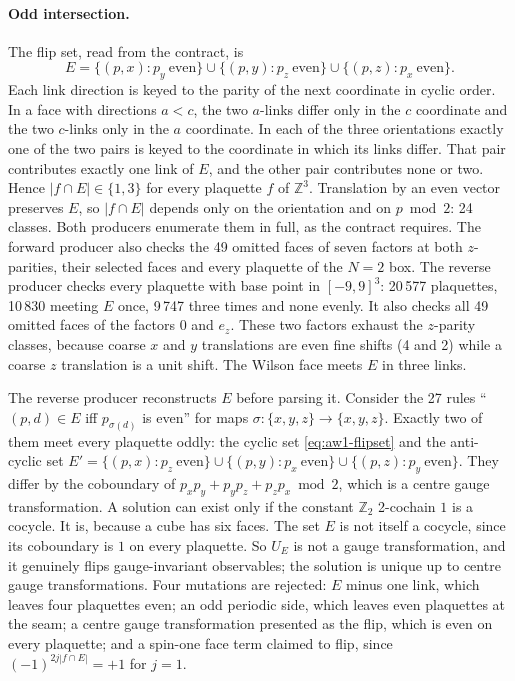 \paragraph{Odd intersection.}
The flip set, read from the contract, is
\begin{equation}
 E=\{(p,x):p_y\ \text{even}\}\cup\{(p,y):p_z\ \text{even}\}\cup\{(p,z):p_x\ \text{even}\}.
 \label{eq:aw1-flipset}
\end{equation}
Each link direction is keyed to the parity of the next coordinate in cyclic
order. In a face with directions $a<c$, the two $a$-links differ only in the
$c$ coordinate and the two $c$-links only in the $a$ coordinate. In each of
the three orientations exactly one of the two pairs is keyed to the
coordinate in which its links differ. That pair contributes exactly one link
of $E$, and the other pair contributes none or two. Hence $|f\cap E|\in\{1,3\}$
for every plaquette $f$ of $\mathbb Z^3$. Translation by an even vector
preserves $E$, so $|f\cap E|$ depends only on the orientation and on
$p\bmod2$: 24 classes. Both producers enumerate them in full, as the contract
requires. The forward producer also checks the 49 omitted faces of seven
factors at both $z$-parities, their selected faces and every plaquette of the
$N=2$ box. The reverse producer checks every plaquette with base point in
$[-9,9]^3$: 20\,577 plaquettes, 10\,830 meeting $E$ once, 9\,747 three times
and none evenly. It also checks all 49 omitted faces of the factors $0$ and
$e_z$. These two factors exhaust the $z$-parity classes, because coarse $x$
and $y$ translations are even fine shifts (4 and 2) while a coarse $z$
translation is a unit shift. The Wilson face meets $E$ in three links.

The reverse producer reconstructs $E$ before parsing it. Consider the 27
rules ``$(p,d)\in E$ iff $p_{\sigma(d)}$ is even'' for maps
$\sigma:\{x,y,z\}\to\{x,y,z\}$. Exactly two of them meet every plaquette
oddly: the cyclic set \eqref{eq:aw1-flipset} and the anti-cyclic set
$E'=\{(p,x):p_z\ \text{even}\}\cup\{(p,y):p_x\ \text{even}\}\cup\{(p,z):p_y\ \text{even}\}$.
They differ by the coboundary of $p_xp_y+p_yp_z+p_zp_x\bmod2$, which is a
centre gauge transformation. A solution can exist only if the constant
$\mathbb Z_2$ 2-cochain $1$ is a cocycle. It is, because a cube has six faces.
The set $E$ is not itself a cocycle, since its coboundary is $1$ on every
plaquette. So $U_E$ is not a gauge transformation, and it genuinely flips
gauge-invariant observables; the solution is unique up to centre gauge
transformations. Four mutations are rejected: $E$ minus one link, which leaves
four plaquettes even; an odd periodic side, which leaves even plaquettes at
the seam; a centre gauge transformation presented as the flip, which is even
on every plaquette; and a spin-one face term claimed to flip, since
$(-1)^{2j|f\cap E|}=+1$ for $j=1$.

